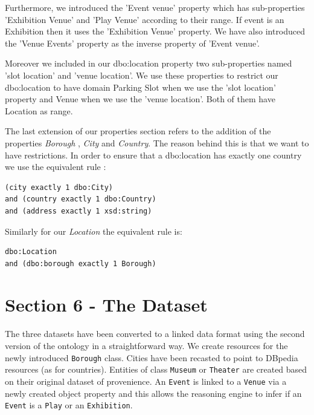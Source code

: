 \documentclass[runningheads,a4paper]{../../StyleFiles/llncs}
\begin{document}
Furthermore, we introduced the 'Event venue' property which has sub-properties 'Exhibition Venue' and 'Play Venue' according to their range. If event is an Exhibition then it uses the 'Exhibition Venue' property. We have also introduced the 'Venue Events' property as the inverse property of 'Event venue'. 

Moreover we included in our dbo:location property two sub-properties named 'slot location' and 'venue location'. We use these properties to restrict our dbo:location to have domain Parking Slot when we use the 'slot location' property and Venue when we use the 'venue location'. Both of them have Location as range.

The last extension of our properties section refers to the addition of the properties \textit{Borough} , \textit{City} and \textit{Country}. The reason behind this is that we want to have restrictions. In order to ensure that a dbo:location has exactly one country we use the equivalent rule : 
\\

\begin{lstlisting}[captionpos=b, title=Class equivalent to dbo:Location with the use of our subproperties, label=lst:owl, basicstyle=\ttfamily\small,frame=bt]
(city exactly 1 dbo:City) 
and (country exactly 1 dbo:Country) 
and (address exactly 1 xsd:string)
\end{lstlisting}


Similarly for our \textit{Location} the equivalent rule is: 

\begin{lstlisting}[captionpos=b, title=Class equivalent to Location with the use of our subproperty orough, label=lst:owl, basicstyle=\ttfamily\small,frame=bt]
dbo:Location 
and (dbo:borough exactly 1 Borough)
\end{lstlisting}

\section{Section 6 - The Dataset}
The three datasets have been converted to a linked data format using the second
version of the ontology in a straightforward way. We create
resources for the newly introduced \texttt{Borough} class. Cities have been
recasted to point to DBpedia resources (as for countries).
Entities of class \texttt{Museum} or \texttt{Theater} are created based on their
original dataset of provenience. An \texttt{Event} is linked to a
\texttt{Venue} via a newly created object property and this allows the reasoning
engine to infer if an \texttt{Event} is a \texttt{Play} or an \texttt{Exhibition}.
\end{document}
